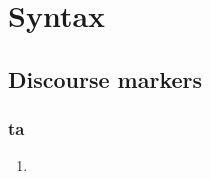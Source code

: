 \chapter{Syntax}

\section{Discourse markers}
\subsection{ta}
\begin{enumerate}
	\item 
\end{enumerate}